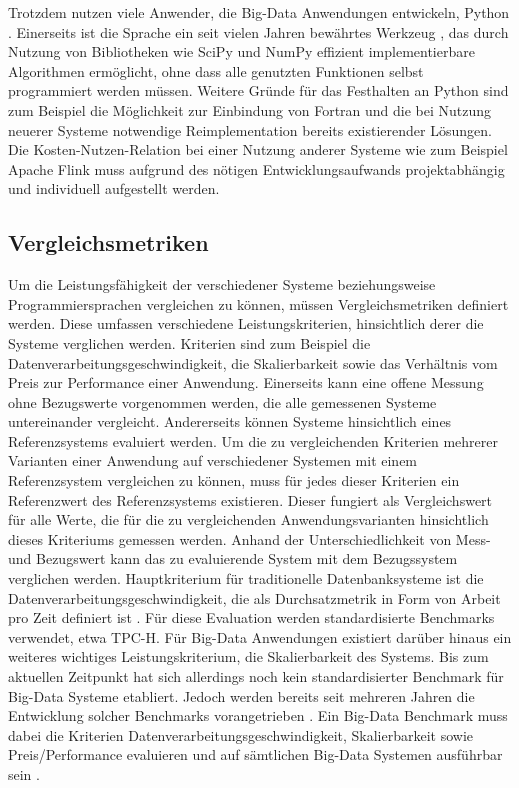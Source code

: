 Trotzdem nutzen viele Anwender, die Big-Data Anwendungen entwickeln, Python \cite{Millman2011}. Einerseits ist die Sprache ein seit vielen Jahren bewährtes Werkzeug \cite{Beazley2000, Oliphant2007}, das durch Nutzung von Bibliotheken wie SciPy und NumPy effizient implementierbare Algorithmen ermöglicht, ohne dass alle genutzten Funktionen selbst programmiert werden müssen. Weitere Gründe für das Festhalten an Python sind zum Beispiel die Möglichkeit zur Einbindung von Fortran und die bei Nutzung neuerer Systeme notwendige Reimplementation bereits existierender Lösungen. Die Kosten-Nutzen-Relation bei einer Nutzung anderer Systeme wie zum Beispiel Apache Flink muss aufgrund des nötigen Entwicklungsaufwands projektabhängig und individuell aufgestellt werden. 

\subsection{Vergleichsmetriken}
\label{sec:Vergleichsmetriken}
Um die Leistungsfähigkeit der verschiedener Systeme beziehungsweise Programmiersprachen vergleichen zu können, müssen Vergleichsmetriken definiert werden. Diese umfassen verschiedene Leistungskriterien, hinsichtlich derer die Systeme verglichen werden. Kriterien sind zum Beispiel die Datenverarbeitungsgeschwindigkeit, die Skalierbarkeit sowie das Verhältnis vom Preis zur Performance einer Anwendung. Einerseits kann eine offene Messung ohne Bezugswerte vorgenommen werden, die alle gemessenen Systeme untereinander vergleicht. Andererseits können Systeme hinsichtlich eines Referenzsystems evaluiert werden. Um die zu vergleichenden Kriterien mehrerer Varianten einer Anwendung auf verschiedener Systemen mit einem Referenzsystem vergleichen zu können, muss für jedes dieser Kriterien ein Referenzwert des Referenzsystems existieren. Dieser fungiert als Vergleichswert für alle Werte, die für die zu vergleichenden Anwendungsvarianten hinsichtlich dieses Kriteriums gemessen werden. Anhand der Unterschiedlichkeit von Mess- und Bezugswert kann das zu evaluierende System mit dem Bezugssystem verglichen werden. Hauptkriterium für traditionelle Datenbanksysteme ist die Datenverarbeitungsgeschwindigkeit, die als Durchsatzmetrik in Form von Arbeit pro Zeit definiert ist \cite{Gray1992}. Für diese Evaluation werden standardisierte Benchmarks verwendet, etwa TPC-H. Für Big-Data Anwendungen existiert darüber hinaus ein weiteres wichtiges Leistungskriterium, die Skalierbarkeit des Systems. Bis zum aktuellen Zeitpunkt hat sich allerdings noch kein standardisierter Benchmark für Big-Data Systeme etabliert. Jedoch werden bereits seit mehreren Jahren die Entwicklung solcher Benchmarks vorangetrieben \cite{Chen2014}. Ein Big-Data Benchmark muss dabei die Kriterien Datenverarbeitungsgeschwindigkeit, Skalierbarkeit sowie Preis/Performance evaluieren und auf sämtlichen Big-Data Systemen ausführbar sein \cite{Baru2013}.

